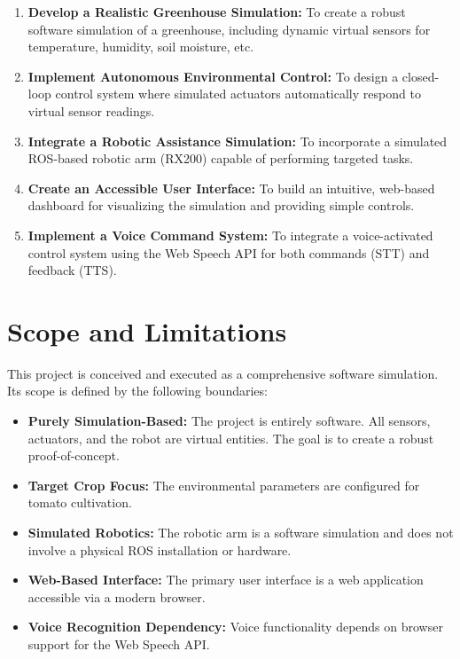 \documentclass[12pt, a4paper]{report}
\begin{document}
\begin{enumerate}
    \item \textbf{Develop a Realistic Greenhouse Simulation:} To create a robust software simulation of a greenhouse, including dynamic virtual sensors for temperature, humidity, soil moisture, etc.
    \item \textbf{Implement Autonomous Environmental Control:} To design a closed-loop control system where simulated actuators automatically respond to virtual sensor readings.
    \item \textbf{Integrate a Robotic Assistance Simulation:} To incorporate a simulated ROS-based robotic arm (RX200) capable of performing targeted tasks.
    \item \textbf{Create an Accessible User Interface:} To build an intuitive, web-based dashboard for visualizing the simulation and providing simple controls.
    \item \textbf{Implement a Voice Command System:} To integrate a voice-activated control system using the Web Speech API for both commands (STT) and feedback (TTS).
\end{enumerate}

\section{Scope and Limitations}
This project is conceived and executed as a comprehensive software simulation. Its scope is defined by the following boundaries:

\begin{itemize}
    \item \textbf{Purely Simulation-Based:} The project is entirely software. All sensors, actuators, and the robot are virtual entities. The goal is to create a robust proof-of-concept.
    \item \textbf{Target Crop Focus:} The environmental parameters are configured for tomato cultivation.
    \item \textbf{Simulated Robotics:} The robotic arm is a software simulation and does not involve a physical ROS installation or hardware.
    \item \textbf{Web-Based Interface:} The primary user interface is a web application accessible via a modern browser.
    \item \textbf{Voice Recognition Dependency:} Voice functionality depends on browser support for the Web Speech API.
\end{itemize}
\end{document}
